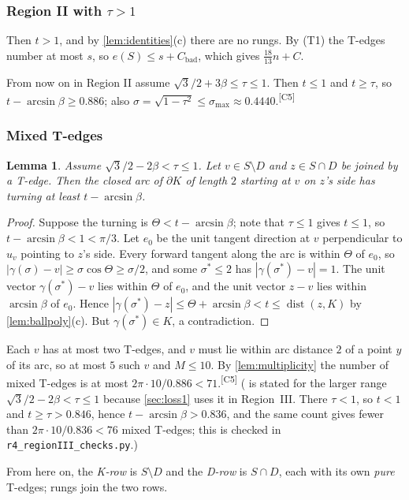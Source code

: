 \documentclass[11pt]{amsart}
\newtheorem{lemma}[theorem]{Lemma}
\theoremstyle{definition}
\theoremstyle{remark}
\newcommand{\dist}{\operatorname{dist}}
\newcommand{\chk}[1]{\textsuperscript{[#1]}}
\begin{document}
\subsubsection*{Region II with $\tau>1$}
Then $t>1$, and by \cref{lem:identities}(c) there are no rungs. By (T1) the T-edges number at most $s$, so $e(S)\le s+C_{\mathrm{bad}}$, which gives $\frac{18}{13}n+C$.

From now on in Region II assume $\sqrt3/2+3\beta\le\tau\le1$. Then $t\le 1$ and $t\ge\tau$, so $t-\arcsin\beta\ge 0.886$; also $\sigma=\sqrt{1-\tau^2}\le\sigma_{\max}\approx0.4440$.\chk{C5}

\subsubsection{Mixed T-edges}
\begin{lemma}\label{lem:mixedT}
Assume $\sqrt3/2-2\beta<\tau\le1$. Let $v\in S\setminus D$ and $z\in S\cap D$ be joined by a T-edge. Then the closed arc of $\partial K$ of length $2$ starting at $v$ on $z$'s side has turning at least $t-\arcsin\beta$.
\end{lemma}
\begin{proof}
Suppose the turning is $\Theta<t-\arcsin\beta$; note that $\tau\le1$ gives $t\le1$, so $t-\arcsin\beta<1<\pi/3$. Let $e_0$ be the unit tangent direction at $v$ perpendicular to $u_v$ pointing to $z$'s side. Every forward tangent along the arc is within $\Theta$ of $e_0$, so $|\gamma(\sigma)-v|\ge\sigma\cos\Theta\ge\sigma/2$, and some $\sigma^*\le2$ has $|\gamma(\sigma^*)-v|=1$. The unit vector $\gamma(\sigma^*)-v$ lies within $\Theta$ of $e_0$, and the unit vector $z-v$ lies within $\arcsin\beta$ of $e_0$. Hence $|\gamma(\sigma^*)-z|\le\Theta+\arcsin\beta<t\le\dist(z,K)$ by \cref{lem:ballpoly}(c). But $\gamma(\sigma^*)\in K$, a contradiction.
\end{proof}
Each $v$ has at most two T-edges, and $v$ must lie within arc distance $2$ of a point $y$ of its arc, so at most $5$ such $v$ and $M\le10$. By \cref{lem:multiplicity} the number of mixed T-edges is at most $2\pi\cdot10/0.886<71$.\chk{C5} ( is stated for the larger range $\sqrt3/2-2\beta<\tau\le1$ because \cref{sec:loss1} uses it in Region~III. There $\tau<1$, so $t<1$ and $t\ge\tau>0.846$, hence $t-\arcsin\beta>0.836$, and the same count gives fewer than $2\pi\cdot10/0.836<76$ mixed T-edges; this is checked in \texttt{r4\_regionIII\_checks.py}.)

From here on, the \emph{K-row} is $S\setminus D$ and the \emph{D-row} is $S\cap D$, each with its own \emph{pure} T-edges; rungs join the two rows.
\end{document}
